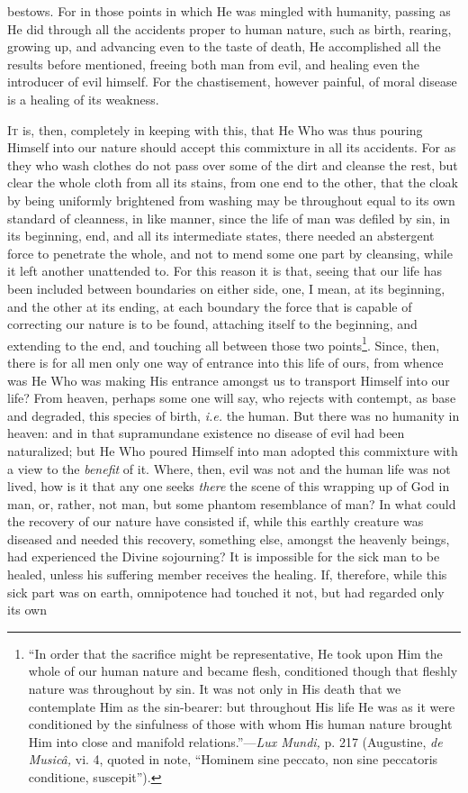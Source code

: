 bestows. For in those points in which He was mingled with humanity, passing as He did through all the accidents proper to human nature, such as birth, rearing, growing up, and advancing even to the taste of death, He accomplished all the results before mentioned, freeing both man from evil, and healing even the introducer of evil himself. For the chastisement, however painful, of moral disease is a healing of its weakness.


\textsc{It} is, then, completely in keeping with this, that He Who was thus pouring Himself into our nature should accept this commixture in all its accidents. For as they who wash clothes do not pass over some of the dirt and cleanse the rest, but clear the whole cloth from all its stains, from one end to the other, that the cloak by being uniformly brightened from washing may be throughout equal to its own standard of cleanness, in like manner, since the life of man was defiled by sin, in its beginning, end, and all its intermediate states, there needed an abstergent force to penetrate the whole, and not to mend some one part by cleansing, while it left another unattended to. For this reason it is that, seeing that our life has been included between boundaries on either side, one, I mean, at its beginning, and the other at its ending, at each boundary the force that is capable of correcting our nature is to be found, attaching itself to the beginning, and extending to the end, and touching all between those two points\footnote{“In order that the sacrifice might be representative, He took upon Him the whole of our human nature and became flesh, conditioned though that fleshly nature was throughout by sin. It was not only in His death that we contemplate Him as the sin-bearer: but throughout His life He was as it were conditioned by the sinfulness of those with whom His human nature brought Him into close and manifold relations.”—\emph{Lux Mundi,} p. 217 (Augustine, \emph{de Musicâ,} vi. 4, quoted in note, “Hominem sine peccato, non sine peccatoris conditione, suscepit”).}. Since, then, there is for all men only one way of entrance into this life of ours, from whence was He Who was making His entrance amongst us to transport Himself into our life? From heaven, perhaps some one will say, who rejects with contempt, as base and degraded, this species of birth, \emph{i.e.} the human. But there was no humanity in heaven: and in that supramundane existence no disease of evil had been naturalized; but He Who poured Himself into man adopted this commixture with a view to the \emph{benefit} of it. Where, then, evil was not and the human life was not lived, how is it that any one seeks \emph{there} the scene of this wrapping up of God in man, or, rather, not man, but some phantom resemblance of man? In what could the recovery of our nature have consisted if, while this earthly creature was diseased and needed this recovery, something else, amongst the heavenly beings, had experienced the Divine sojourning? It is impossible for the sick man to be healed, unless his suffering member receives the healing. If, therefore, while this sick part was on earth, omnipotence had touched it not, but had regarded only its own 